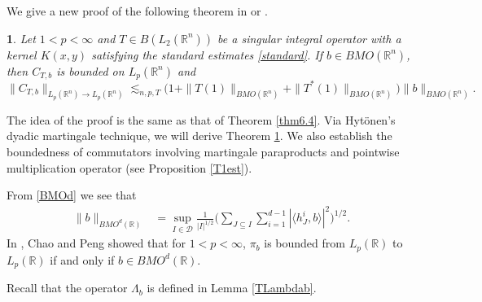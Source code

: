 \documentclass[oneside,english,a4wide]{amsart}
\numberwithin{equation}{section}
\numberwithin{figure}{section}
\theoremstyle{plain}
\newtheorem{thm}{\protect\theoremname}[section]
\theoremstyle{plain}
\theoremstyle{definition}
\theoremstyle{plain}
\theoremstyle{remark}
\theoremstyle{definition}
\theoremstyle{remark}
\theoremstyle{definition}
\providecommand{\theoremname}{Theorem}
\newcommand{\8}{\infty}
\begin{document}
We give a new proof of the following theorem in \cite[Theorem 1.1]{HLW} or \cite[Theorem 3.1]{CPP2012}.
\begin{thm}\label{thm1.7}
	Let $1<p<\infty$ and $T\in B(L_2(\mathbb{R}^n))$ be a singular integral operator with a kernel $K(x,y)$ satisfying the standard estimates \eqref{standard}. If $b\in BMO(\mathbb{R}^n)$, then $C_{T, b}$ is bounded on $L_p(\mathbb{R}^n)$ and
	$$ \|C_{T, b}\|_{L_p(\mathbb{R}^n)\rightarrow L_p(\mathbb{R}^n)}\lesssim_{n, p,T}\big(1+\|T(1)\|_{BMO(\mathbb{R}^n)}+\|T^*(1)\|_{BMO(\mathbb{R}^n)}\big)\|b\|_{BMO(\mathbb{R}^n)}. $$
\end{thm}
The idea of the proof is the same as that of Theorem \ref{thm6.4}. 
Via Hyt\"{o}nen's dyadic martingale technique, we will derive Theorem \ref{thm1.7}. We also establish the boundedness of commutators involving martingale paraproducts and pointwise multiplication operator (see Proposition \ref{T1est}).




From \eqref{BMOd} we see that
\begin{equation*}
	\begin{aligned}
		\|b\|_{BMO^d(\mathbb{R})}{}&
		=\sup_{I\in\mathcal{D}}\frac{1}{|I|^{1/2}}\biggl(\sum_{J\subseteq I}\sum_{i=1}^{d-1}|\langle h_J^i,b\rangle|^2 \biggr)^{1/2}.
	\end{aligned}
\end{equation*}
In \cite{CP}, Chao and Peng showed that for $1<p<\8$, $\pi_b$ is bounded from $L_p(\mathbb{R})$ to $L_p(\mathbb{R})$ if and only if $b\in BMO^d(\mathbb{R})$.

Recall that the operator $\varLambda_b$ is defined in Lemma \ref{TLambdab}. 
\end{document}
